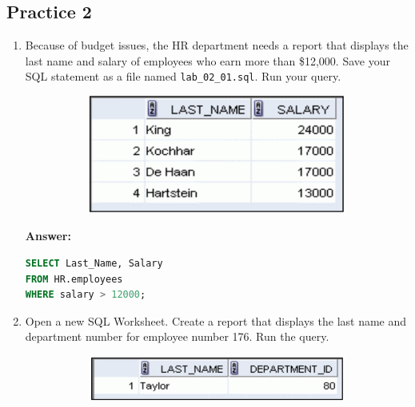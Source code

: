 \documentclass[a4paper,12pt]{article}
\begin{document}
\subsection*{Practice 2}
\begin{enumerate}
    \item Because of budget issues, the HR department needs a report that displays the last name and
salary of employees who earn more than \$12,000. Save your SQL statement as a file named
\texttt{lab\_02\_01.sql}. Run your query.
\begin{figure}[h]
        \centering
        \begin{subfigure}[b]{0.4\linewidth}
            \centering
            \includegraphics[width=\linewidth]{graphics/21.png}
        \end{subfigure}
    \end{figure}

    \textbf{Answer: }
    \begin{lstlisting}[language=SQL, label={lst:employees_data}]
SELECT Last_Name, Salary
FROM HR.employees
WHERE salary > 12000;
    \end{lstlisting}
        \item Open a new SQL Worksheet. Create a report that displays the last name and department number
for employee number 176. Run the query.
\begin{figure}[h]
        \centering
        \begin{subfigure}[b]{0.4\linewidth}
            \centering
            \includegraphics[width=\linewidth]{graphics/22.png}
        \end{subfigure}
    \end{figure}


\end{enumerate}
\end{document}
